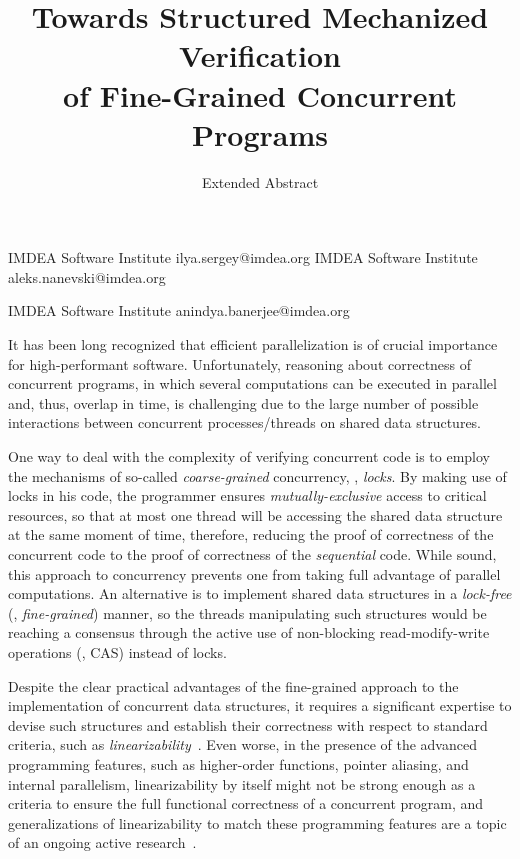 \documentclass[blockstyle,preprint,nocopyrightspace]{sigplanconf}
\begin{document}
\setlength{\pdfpageheight}{\paperheight}
\setlength{\pdfpagewidth}{\paperwidth}


           {IMDEA Software Institute}
           {ilya.sergey@imdea.org}
%
           {IMDEA Software Institute}
           {aleks.nanevski@imdea.org}

           {IMDEA Software Institute}
           {anindya.banerjee@imdea.org}

\title{
Towards Structured Mechanized Verification\\
of Fine-Grained Concurrent Programs 
}

\subtitle{Extended Abstract}

\maketitle
 
It has been long recognized that efficient parallelization is of
crucial importance for high-performant software. Unfortunately,
reasoning about correctness of concurrent programs, in which several
computations can be executed in parallel and, thus, overlap in time,
is challenging due to the large number of possible interactions
between concurrent processes/threads on shared data structures.

One way to deal with the complexity of verifying concurrent code is to
employ the mechanisms of so-called \emph{coarse-grained} concurrency,
\ie, \emph{locks}. By making use of locks in his code, the programmer
ensures \emph{mutually-exclusive} access to critical resources, so
that at most one thread will be accessing the shared data structure at
the same moment of time, therefore, reducing the proof of correctness
of the concurrent code to the proof of correctness of the
\emph{sequential} code. While sound, this approach to concurrency
prevents one from taking full advantage of parallel computations. An
alternative is to implement shared data structures in a
\emph{lock-free} (\ie, \emph{fine-grained}) manner, so the threads
manipulating such structures would be reaching a consensus through the
active use of non-blocking read-modify-write operations (\eg, CAS)
instead of locks.

Despite the clear practical advantages of the fine-grained approach to
the implementation of concurrent data structures, it requires a
significant expertise to devise such structures and establish their
correctness with respect to standard criteria, such as
\emph{linearizability}~\cite{Herlihy-Wing:TOPLAS90,Burckhardt-al:PLDI10}.
%
Even worse, in the presence of the advanced programming features, such
as higher-order functions, pointer aliasing, and internal parallelism,
linearizability by itself might not be strong enough as a criteria to
ensure the full functional correctness of a concurrent program, and
generalizations of linearizability to match these programming features
are a topic of an ongoing active
research~\cite{Cerone-al:ICALP14,Gotsman-Yang:CONCUR12}.
\end{document}
